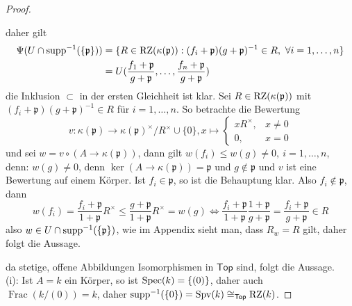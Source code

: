 \begin{proof}
\begin{enumerate}[(i)]
\[        \]
        daher gilt 
        \begin{align*}
            \Psi(U\cap \operatorname{supp}^{-1}(\{\mathfrak{p}\})) &= \{ R \in \operatorname{RZ}(\kappa(\mathfrak{p})) : (f_i+\mathfrak{p})(g+\mathfrak{p})^{-1} \in R,\ \forall i=1,\ldots,n\} 
            \\ &= U (\frac{f_1+\mathfrak{p}}{g+\mathfrak{p}},\ldots,\frac{f_n+\mathfrak{p}}{g+\mathfrak{p}})     
        \end{align*}
        die Inklusion $\subset$ in der ersten Gleichheit ist klar. Sei $R\in \operatorname{RZ}(\kappa(\mathfrak{p}))$ mit $(f_i+\mathfrak{p})(g+\mathfrak{p})^{-1}\in R$ für $i=1,\ldots,n$. 
        So betrachte die Bewertung 
        \[
            v:\kappa(\mathfrak{p}) \to \kappa(\mathfrak{p})^\times/R^\times \cup\{0\}, x \mapsto \begin{cases}
                xR^\times, & x\neq 0 \\
                0, & x=0
            \end{cases}
        \]
        und sei $w=v\circ (A\to \kappa(\mathfrak{p}))$, dann gilt $w(f_i)\le w(g)\neq 0, \ i=1,\ldots,n$, denn: $w(g)\neq 0$, denn $\ker(A\to \kappa(\mathfrak{p}))=\mathfrak{p}$ und $g\notin \mathfrak{p}$ und $v$ ist eine Bewertung auf einem Körper. Ist $f_i \in \mathfrak{p}$, so ist die Behauptung klar. Also $f_i \notin \mathfrak{p}$, dann 
        \[
        w(f_i) = \frac{f_i+\mathfrak{p}}{1+\mathfrak{p}}R^\times \le \frac{g+\mathfrak{p}}{1+\mathfrak{p}}R^\times =w(g) \Leftrightarrow \frac{f_i+\mathfrak{p}}{1+\mathfrak{p}}\frac{1+\mathfrak{p}}{g+\mathfrak{p}} = \frac{f_i+\mathfrak{p}}{g+\mathfrak{p}} \in R    
        \]
        also $w\in U\cap \operatorname{supp}^{-1}(\{\mathfrak{p}\})$, wie im Appendix sieht man, dass $R_w  = R$ gilt, daher folgt die Aussage.
    \end{enumerate}
    da stetige, offene Abbildungen Isomorphismen in $\mathsf{Top}$ sind, folgt die Aussage. \\
    (i): Ist $A=k$ ein Körper, so ist $\operatorname{Spec}(k) = \{ (0) \}$, daher auch $\operatorname{Frac}(k/(0)) =k$, daher $\operatorname{supp}^{-1}(\{ 0\}) = \operatorname{Spv}(k) \cong_{\mathsf{Top}} \operatorname{RZ}(k)$. 
\end{proof}